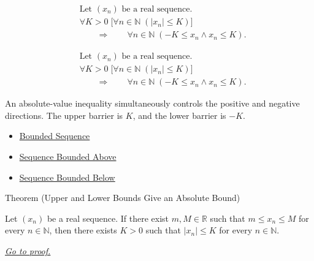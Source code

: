 \begin{remark*}
\[
\begin{aligned}
&\text{Let } (x_n) \text{ be a real sequence.}\\
&\forall K > 0\;
\bigl[
\forall n \in \mathbb{N}\;(|x_n| \le K)
\bigr]\\
&\qquad\Longrightarrow\qquad
\forall n \in \mathbb{N}\;(-K \le x_n \land x_n \le K).
\end{aligned}
\]
\end{remark*}

\begin{remark*}
\[
\begin{aligned}
&\text{Let } (x_n) \text{ be a real sequence.}\\
&\forall K > 0\;
\bigl[
\forall n \in \mathbb{N}\;(|x_n| \le K)
\bigr]\\
&\qquad\Longrightarrow\qquad
\forall n \in \mathbb{N}\;(-K \le x_n \land x_n \le K).
\end{aligned}
\]
\end{remark*}

\begin{remark*}[Interpretation]
An absolute-value inequality simultaneously controls the positive and negative
directions. The upper barrier is $K$, and the lower barrier is $-K$.
\end{remark*}

\begin{dependencies}
\begin{itemize}
  \item \hyperref[def:bounded-sequence]{Bounded Sequence}
  \item \hyperref[def:sequence-bounded-above]{Sequence Bounded Above}
  \item \hyperref[def:sequence-bounded-below]{Sequence Bounded Below}
\end{itemize}
\end{dependencies}


\begin{theorembox}{Theorem (Upper and Lower Bounds Give an Absolute Bound)}
\begin{theorem}
\label{thm:upper-lower-bounds-absolute-bound}
Let $(x_n)$ be a real sequence. If there exist $m,M \in \mathbb{R}$ such
that $m \le x_n \le M$ for every $n \in \mathbb{N}$, then there exists
$K > 0$ such that $|x_n| \le K$ for every $n \in \mathbb{N}$.

\smallskip
\noindent
\hyperref[prf:upper-lower-bounds-absolute-bound]{\textit{Go to proof.}}
\end{theorem}
\end{theorembox}

